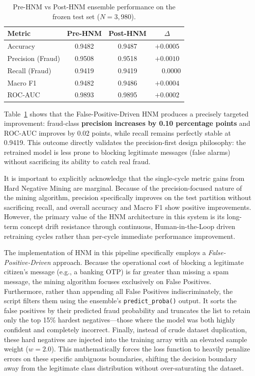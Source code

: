 \begin{table}[H]
\centering
\caption{Pre-HNM vs Post-HNM ensemble performance on the frozen test set ($N = 3{,}980$).}
\label{tab:hnm-ablation}
\begin{tabular}{|l|c|c|c|}
\hline
\textbf{Metric}        & \textbf{Pre-HNM} & \textbf{Post-HNM} & \textbf{$\Delta$} \\ \hline
Accuracy               & 0.9482           & 0.9487            & $+0.0005$ \\ \hline
Precision (Fraud)      & 0.9508           & 0.9518            & $+0.0010$ \\ \hline
Recall (Fraud)         & 0.9419           & 0.9419            & $\phantom{+}0.0000$ \\ \hline
Macro F1               & 0.9482           & 0.9486            & $+0.0004$ \\ \hline
ROC-AUC                & 0.9893           & 0.9895            & $+0.0002$ \\ \hline
\end{tabular}
\end{table}

Table~\ref{tab:hnm-ablation} shows that the False-Positive-Driven HNM produces a precisely targeted improvement: fraud-class \textbf{precision increases by 0.10 percentage points} and ROC-AUC improves by 0.02 points, while recall remains perfectly stable at 0.9419. This outcome directly validates the precision-first design philosophy: the retrained model is less prone to blocking legitimate messages (false alarms) without sacrificing its ability to catch real fraud.

It is important to explicitly acknowledge that the single-cycle metric gains from Hard Negative Mining are marginal. Because of the precision-focused nature of the mining algorithm, precision specifically improves on the test partition without sacrificing recall, and overall accuracy and Macro F1 show positive improvements. However, the primary value of the HNM architecture in this system is its long-term concept drift resistance through continuous, Human-in-the-Loop driven retraining cycles rather than per-cycle immediate performance improvement.

The implementation of HNM in this pipeline specifically employs a \textit{False-Positive-Driven} approach. Because the operational cost of blocking a legitimate citizen's message (e.g., a banking OTP) is far greater than missing a spam message, the mining algorithm focuses exclusively on False Positives. Furthermore, rather than appending all False Positives indiscriminately, the script filters them using the ensemble's \texttt{predict\_proba()} output. It sorts the false positives by their predicted fraud probability and truncates the list to retain only the top 15\% hardest negatives---those where the model was both highly confident and completely incorrect. Finally, instead of crude dataset duplication, these hard negatives are injected into the training array with an elevated sample weight ($w=2.0$). This mathematically forces the loss function to heavily penalize errors on these specific ambiguous boundaries, shifting the decision boundary away from the legitimate class distribution without over-saturating the dataset.

